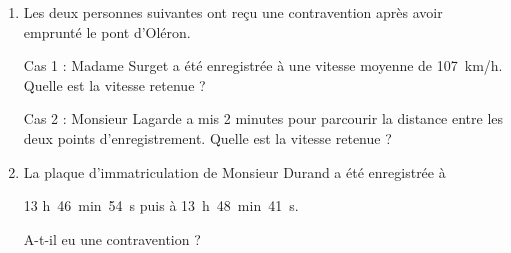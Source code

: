 \begin{enumerate}
\item Les deux personnes suivantes ont reçu une contravention après avoir emprunté le pont d'Oléron. 

Cas 1 : Madame Surget a été enregistrée à une vitesse moyenne de 107~km/h. Quelle est la vitesse retenue ? 

Cas 2 : Monsieur Lagarde a mis 2 minutes pour parcourir la distance entre les deux points d'enregistrement. Quelle est la vitesse retenue ? 

\item La plaque d'immatriculation de Monsieur Durand a été enregistrée à 

13 h~46~min~54~s puis à 13~h~48~min~41~s. 

A-t-il eu une contravention ? 
\end{enumerate}

\vspace{0.5cm}

